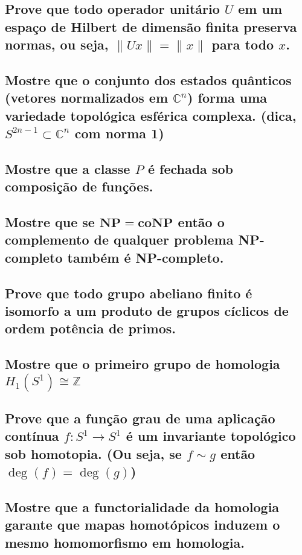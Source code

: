 \documentclass{article}
\begin{document}
\subsection{Prove que todo operador unitário $U$ em um espaço de Hilbert de dimensão finita preserva normas, ou seja, $\|Ux\| = \|x\|$ para todo $x$.}

\subsection{Mostre que o conjunto dos estados quânticos (vetores normalizados em $\mathbb{C}^n$) forma uma variedade topológica esférica complexa. (dica, $S^{2n-1} \subset \mathbb{C}^n$ com norma 1)}

\subsection{Mostre que a classe $P$ é fechada sob composição de funções.}

\subsection{Mostre que se $\mathbf{NP} = \mathbf{coNP}$ então o complemento de qualquer problema NP-completo também é NP-completo.}

\subsection{Prove que todo grupo abeliano finito é isomorfo a um produto de grupos cíclicos de ordem potência de primos.}

\subsection{Mostre que o primeiro grupo de homologia $H_1(S^1) \cong \mathbb{Z}$}

\subsection{Prove que a função grau de uma aplicação contínua $f: S^1 \to S^1$ é um invariante topológico sob homotopia. (Ou seja, se $f \sim g$ então $\deg(f) = \deg(g)$)}

\subsection{Mostre que a functorialidade da homologia garante que mapas homotópicos induzem o mesmo homomorfismo em homologia.}
\end{document}
